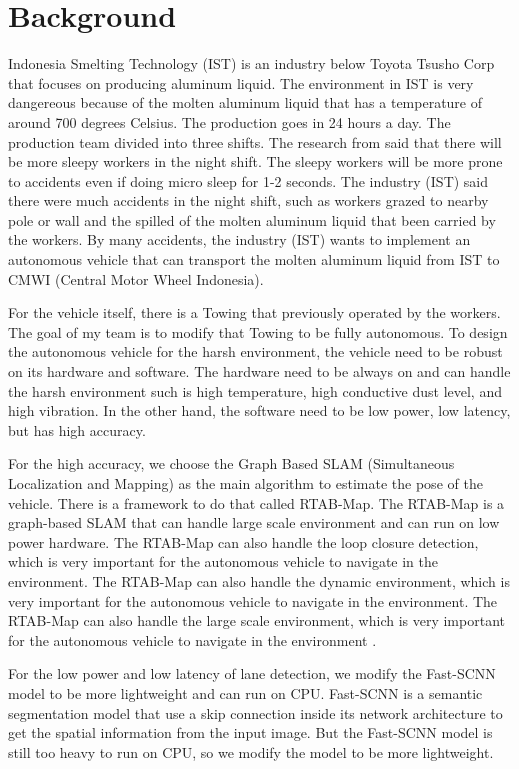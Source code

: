 \documentclass[conference, a4paper]{IEEEtran}[2015/08/26]
\begin{document}
\section{Background}
Indonesia Smelting Technology (IST) is an industry below Toyota Tsusho Corp that focuses on producing aluminum liquid. The environment in IST is very dangereous because of the molten aluminum liquid that has a temperature of around 700 degrees Celsius. The production goes in 24 hours a day. The production team divided into three shifts. The research from \cite{ref_sleep} said that there will be more sleepy workers in the night shift. The sleepy workers will be more prone to accidents even if doing micro sleep for 1-2 seconds. The industry (IST) said there were much accidents in the night shift, such as workers grazed to nearby pole or wall and the spilled of the molten aluminum liquid that been carried by the workers. By many accidents, the industry (IST) wants to implement an autonomous vehicle that can transport the molten aluminum liquid from IST to CMWI (Central Motor Wheel Indonesia). 

\par    
For the vehicle itself, there is a Towing that previously operated by the workers. The goal of my team is to modify that Towing to be fully autonomous. To design the autonomous vehicle for the harsh environment, the vehicle need to be robust on its hardware and software. The hardware need to be always on and can handle the harsh environment such is high temperature, high conductive dust level, and high vibration. In the other hand, the software need to be low power, low latency, but has high accuracy.

\par    
For the high accuracy, we choose the Graph Based SLAM (Simultaneous Localization and Mapping) as the main algorithm to estimate the pose of the vehicle. There is a framework to do that called RTAB-Map. The RTAB-Map is a graph-based SLAM that can handle large scale environment and can run on low power hardware. The RTAB-Map can also handle the loop closure detection, which is very important for the autonomous vehicle to navigate in the environment. The RTAB-Map can also handle the dynamic environment, which is very important for the autonomous vehicle to navigate in the environment. The RTAB-Map can also handle the large scale environment, which is very important for the autonomous vehicle to navigate in the environment \cite{ref_rtabmap}.  

\par    
For the low power and low latency of lane detection, we modify the Fast-SCNN model \cite{ref_fast_scnn} to be more lightweight and can run on CPU. Fast-SCNN is a semantic segmentation model that use a skip connection inside its network architecture to get the spatial information from the input image. But the Fast-SCNN model is still too heavy to run on CPU, so we modify the model to be more lightweight.  
\end{document}
